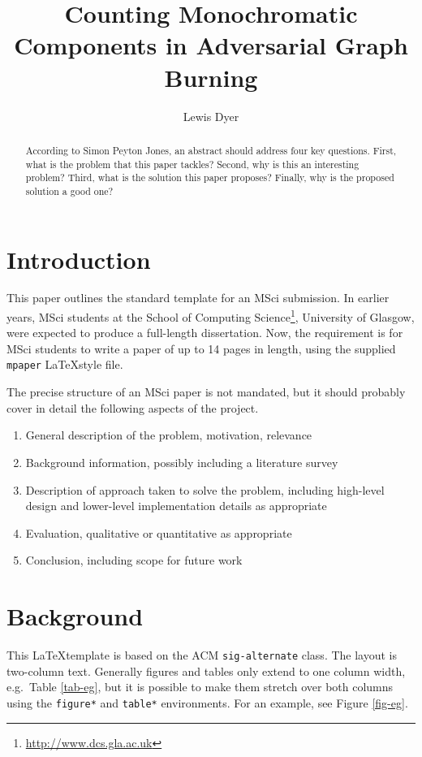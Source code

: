 \documentclass{mpaper}
\begin{document}
\title{Counting Monochromatic Components in Adversarial Graph Burning}
\author{Lewis Dyer}

\maketitle

\begin{abstract}
According to Simon Peyton Jones, an abstract should address
four key questions. First, what is the problem that this
paper tackles? Second, why is this an interesting problem?
Third, what is the solution this paper proposes?
Finally, why is the proposed solution a good one?
\end{abstract}

\section{Introduction}

This paper outlines the standard template for an MSci submission.
In earlier years, MSci students at the School of Computing
Science\footnote{\url{http://www.dcs.gla.ac.uk}},
University of Glasgow, were expected to produce a full-length
dissertation. Now, the requirement is for MSci students to
write a paper of up to 14 pages in length, using the supplied
\texttt{mpaper} \LaTeX style file.

The precise structure of an MSci paper is not mandated, but it should
probably cover in detail the following aspects of the project.
\begin{enumerate}
\item General description of the problem, motivation, relevance
\item Background information, possibly including a literature survey
\item Description of approach taken to solve the problem, including
  high-level design and lower-level implementation details as appropriate
\item Evaluation, qualitative or quantitative as appropriate
\item Conclusion, including scope for future work
\end{enumerate}

\section{Background}

This \LaTeX template is based on the ACM \texttt{sig-alternate} class.
The layout is two-column text. Generally figures and tables only
extend to one column width, e.g.\ Table \ref{tab-eg},
but it is possible to make them
stretch over both columns using the \texttt{figure*} and
\texttt{table*} environments. For an example, see Figure \ref{fig-eg}.
\end{document}
